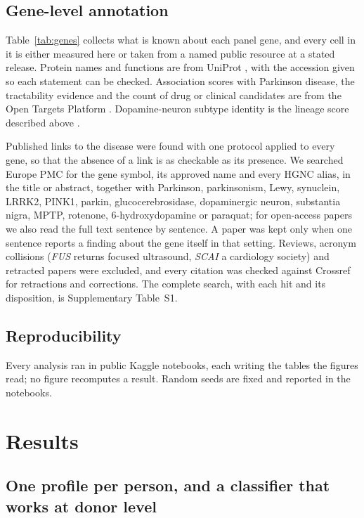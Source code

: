 \documentclass[11pt,a4paper]{article}
\begin{document}
\subsection{Gene-level annotation}

Table~\ref{tab:genes} collects what is known about each panel gene, and every cell in it is either measured
here or taken from a named public resource at a stated release. Protein names and functions are from UniProt
\citep{uniprot2025}, with the accession given so each statement can be checked. Association scores with
Parkinson disease, the tractability evidence and the count of drug or clinical candidates are from the Open
Targets Platform \citep{buniello2025}. Dopamine-neuron subtype identity is the lineage score described above
\citep{kamath2022}.

Published links to the disease were found with one protocol applied to every gene, so that the absence of a
link is as checkable as its presence. We searched Europe PMC \citep{europepmc2024} for the gene symbol, its
approved name and every HGNC alias, in the title or abstract, together with Parkinson, parkinsonism, Lewy,
synuclein, LRRK2, PINK1, parkin, glucocerebrosidase, dopaminergic neuron, substantia nigra, MPTP, rotenone,
6-hydroxydopamine or paraquat; for open-access papers we also read the full text sentence by sentence. A
paper was kept only when one sentence reports a finding about the gene itself in that setting. Reviews,
acronym collisions (\textit{FUS} returns focused ultrasound, \textit{SCAI} a cardiology society) and
retracted papers were excluded, and every citation was checked against Crossref for retractions and
corrections. The complete search, with each hit and its disposition, is Supplementary Table~S1.

\subsection{Reproducibility}

Every analysis ran in public Kaggle notebooks, each writing the tables the figures read; no figure recomputes
a result. Random seeds are fixed and reported in the notebooks.

\section{Results}

\subsection{One profile per person, and a classifier that works at donor level}
\end{document}
